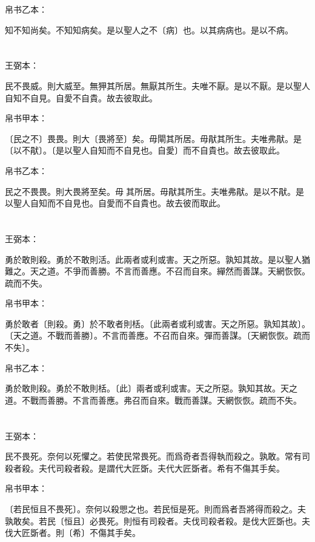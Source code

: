 \documentclass[a5paper]{ctexbook}
\begin{document}
    帛书乙本：

    知不知尚矣。不知知病矣。是以聖人之不〔病〕也。以其病病也。是以不病。

    \chapter{}
    王弼本：

    民不畏威。則大威至。無狎其所居。無厭其所生。夫唯不厭。是以不厭。是以聖人自知不自見。自愛不自貴。故去彼取此。

    
    帛书甲本：

    〔民之不〕畏畏。則大〔畏將至〕矣。毋閘其所居。毋猒其所生。夫唯弗猒。是〔以不猒〕。〔是以聖人自知而不自見也。自愛〕而不自貴也。故去彼取此。

    帛书乙本：

    民之不畏畏。則大畏將至矣。毋𠇺其所居。毋猒其所生。夫唯弗猒。是以不猒。是以聖人自知而不自見也。自愛而不自貴也。故去彼而取此。

    \chapter{}
    王弼本：

    勇於敢則殺。勇於不敢則活。此兩者或利或害。天之所惡。孰知其故。是以聖人猶難之。天之道。不爭而善勝。不言而善應。不召而自來。繟然而善謀。天網恢恢。疏而不失。

    
    帛书甲本：

    勇於敢者〔則殺。勇〕於不敢者則栝。〔此兩者或利或害。天之所惡。孰知其故〕。〔天之道。不戰而善勝〕。不言而善應。不召而自來。彈而善謀。〔天網恢恢。疏而不失〕。

    帛书乙本：

    勇於敢則殺。勇於不敢則栝。〔此〕兩者或利或害。天之所惡。孰知其故。天之道。不戰而善勝。不言而善應。弗召而自來。戰而善謀。天網恢恢。疏而不失。

    \chapter{}
    王弼本：

    民不畏死。奈何以死懼之。若使民常畏死。而爲奇者吾得執而殺之。孰敢。常有司殺者殺。夫代司殺者殺。是謂代大匠斲。夫代大匠斲者。希有不傷其手矣。

    
    帛书甲本：

    〔若民恒且不畏死〕。奈何以殺愳之也。若民恒是死。則而爲者吾將得而殺之。夫孰敢矣。若民〔恒且〕必畏死。則恒有司殺者。夫伐司殺者殺。是伐大匠斲也。夫伐大匠斲者。則〔希〕不傷其手矣。
\end{document}
